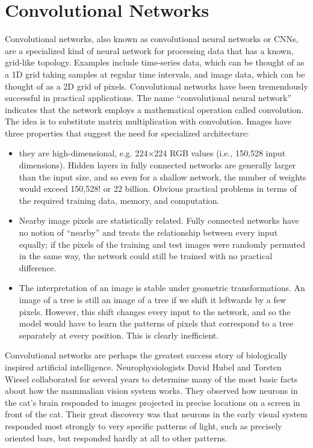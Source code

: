 \section{Convolutional Networks}
Convolutional networks, also known as convolutional neural networks or CNNs, are a specialized kind of neural network for processing data that has a known, grid-like topology. Examples include time-series data, which can be thought of as a 1D grid taking samples at regular time intervals, and image data, which can be thought of as a 2D grid of pixels. Convolutional networks have been tremendously successful in practical applications. The name “convolutional neural network” indicates that the network employs a mathematical operation called convolution. The idea is to substitute matrix multiplication with convolution.\newline\newline
Images have three properties that suggest the need for specialized architecture:
\begin{itemize}
    \item they are high-dimensional, e.g. 224×224 RGB values (i.e., 150,528 input dimensions). Hidden layers in fully connected networks are generally larger than the input size, and so even for a shallow network, the number of weights would exceed 150,528! or 22 billion. Obvious practical problems in terms of the required training data, memory, and computation.

    \item Nearby image pixels are statistically related. Fully connected networks have no notion of “nearby” and treats the relationship between every input equally; if the pixels of the training and test images were randomly permuted in the same way, the network could still be trained with no practical difference.

    \item The interpretation of an image is stable under geometric transformations. An image of a tree is still an image of a tree if we shift it leftwards by a few pixels. However, this shift changes every input to the network, and so the model would have to learn the patterns of pixels that correspond to a tree separately at every position. This is clearly inefficient.
\end{itemize}
Convolutional networks are perhaps the greatest success story of biologically
inspired artificial intelligence. Neurophysiologists
David Hubel and Torsten Wiesel collaborated for several years to determine many of the most basic facts about how the mammalian vision system works. They observed how neurons in the cat’s brain responded to images projected
in precise locations on a screen in front of the cat. Their great discovery was that neurons in the early visual system responded most strongly to very specific patterns of light, such as precisely oriented bars, but responded hardly at all to other patterns.

